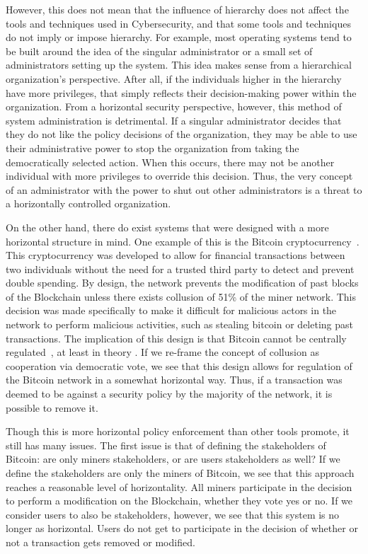 However, this does not mean that the influence of hierarchy does not affect the
tools and techniques used in Cybersecurity, and that some tools and techniques
do not imply or impose hierarchy. For example, most operating systems
tend to be built around the idea of the singular administrator or a small set of
administrators setting up the system. This idea makes sense from a  hierarchical
organization's perspective. After all, if the individuals higher in the
hierarchy have more privileges, that simply reflects their decision-making 
power within the organization. From a horizontal security perspective, however,
this method of system administration is detrimental. If a singular administrator
decides that they do not like the policy decisions of the organization, they may
be able to use their administrative power to stop the organization from taking
the democratically selected action. When this occurs, there may not be another
individual with more privileges to override this decision. Thus, the very
concept of an administrator with the power to shut out other administrators is a
threat to a horizontally controlled organization.

On the other hand, there do exist systems that were designed with a more
horizontal structure in mind. One example of this is the Bitcoin 
cryptocurrency~\cite{nakamoto2019bitcoin}. This cryptocurrency was developed to
allow for financial transactions between two individuals without the need for a
trusted third party to detect and prevent double spending. By design, the
network prevents the modification of past blocks of the Blockchain unless there
exists collusion of 51\% of the miner network. This decision was made
specifically to make it difficult for malicious actors in the network to perform
malicious activities, such as stealing bitcoin or deleting past transactions.
The implication of this design is that Bitcoin cannot be centrally 
regulated~\cite{tu2015rethinking}, at least in theory . If we re-frame the
concept of collusion as cooperation via democratic vote, we see that this design
allows for regulation of the Bitcoin network in a somewhat horizontal way. Thus,
if a transaction was deemed to be against a security policy by the majority of
the network, it is possible to remove it.

Though this is more horizontal policy enforcement than other tools promote, it
still has many issues. The first issue is that of defining the stakeholders of
Bitcoin: are only miners stakeholders, or are users stakeholders as well? If we
define the stakeholders are only the miners of Bitcoin, we see that this
approach reaches a reasonable level of horizontality. All miners participate in
the decision to perform a modification on the Blockchain, whether they vote yes
or no. If we consider users to also be stakeholders, however, we see that this
system is no longer as horizontal. Users do not get to participate in the
decision of whether or not a transaction gets removed or modified. 

